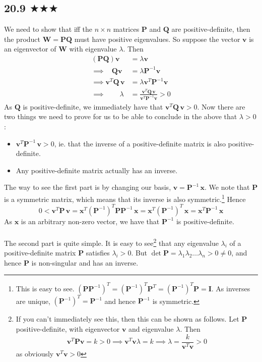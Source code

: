 

\subsection{20.9 $\bigstar\bigstar\bigstar$}
We need to show that iff the $n\times n$ matrices $\mathbf{P}$ and $\mathbf{Q}$ are positive-definite, then the product  $\mathbf{W}=\mathbf{P}\mathbf{Q}$ must have positive eigenvalues. So suppose the vector $\mathbf{v}$ is an eigenvector of $\mathbf{W}$ with eigenvalue $\lambda$. Then 
\begin{align*}
(\mathbf{P}\mathbf{Q})\mathbf{v}&=\lambda\mathbf{v}\\
\implies \ \  \ \ \mathbf{Q}\mathbf{v}&=\lambda \mathbf{P}^{-1}\mathbf{v}\\
\implies \mathbf{v}^T\mathbf{Q}\,\mathbf{v}&=\lambda \mathbf{v}^T\mathbf{P}^{-1}\mathbf{v}\\
\implies \qquad  \lambda&= \frac{\mathbf{v}^T\mathbf{Q}\,\mathbf{v}}{\mathbf{v}^T\mathbf{P}^{-1}\mathbf{v}}>0
\end{align*}
As $\mathbf{Q}$ is positive-definite, we immediately have that $\mathbf{v}^T\mathbf{Q}\,\mathbf{v}>0$. Now there are two things we need to prove for us to be able to conclude in the above that $\lambda>0$:
\begin{itemize}
\item $\mathbf{v}^T\mathbf{P}^{-1}\,\mathbf{v}>0$, ie. that the inverse of a positive-definite matrix is also positive-definite. 
\item Any positive-definite matrix actually has an inverse.
\end{itemize}  
The way to see the first part is by changing our basis, $\mathbf{v}= \mathbf{P}^{-1}\,\mathbf{x}$. We note that $\mathbf{P}$ is a symmetric matrix, which means that its inverse is also symmetric.\footnote{This is easy to see. $(\mathbf{P}\mathbf{P}^{-1})^T=(\mathbf{P}^{-1})^T\mathbf{P}^T=(\mathbf{P}^{-1})^T\mathbf{P}=\mathbf{I}$. As inverses are unique, $(\mathbf{P}^{-1})^T=\mathbf{P}^{-1}$ and hence $\mathbf{P}^{-1}$ is symmetric. } Hence 
$$0<\mathbf{v}^T\mathbf{P}\,\mathbf{v}= \mathbf{x}^T(\mathbf{P}^{-1})^T\mathbf{P}\mathbf{P}^{-1}\,\mathbf{x}=\mathbf{x}^T(\mathbf{P}^{-1})^T\,\mathbf{x}=\mathbf{x}^T\mathbf{P}^{-1}\,\mathbf{x}$$ As $\mathbf{x}$ is an arbitrary non-zero vector, we have that $\mathbf{P}^{-1}$ is positive-definite.\\ \\ The second part is quite simple. It is easy to see\footnote{If you can't immediately see this, then this can be shown as follows. Let $\mathbf{P}$ positive-definite, with eigenvector $\mathbf{v}$ and eigenvalue $\lambda$. Then $$\mathbf{v}^T\mathbf{P}\mathbf{v}=k>0\implies\mathbf{v}^T\mathbf{v}\lambda =k\implies \lambda=\frac{k}{\mathbf{v}^T\mathbf{v}}>0$$ as obviously $\mathbf{v}^T\mathbf{v}>0$ } that any eigenvalue $\lambda_i$ of a positive-definite matrix $\mathbf{P}$ satisfies $\lambda_i>0$. But $\det \mathbf{P}=\lambda_1\lambda_2\ldots\lambda_n>0\neq 0$, and hence $\mathbf{P}$ is non-singular and has an inverse.


